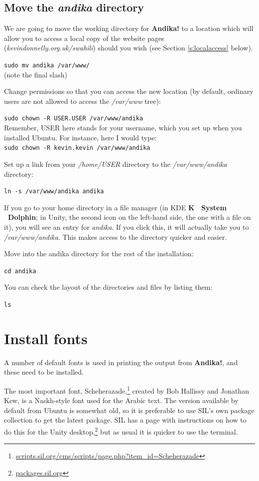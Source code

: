 \subsection{Move the \textit{andika} directory}

We are going to move the working directory for \textbf{Andika!} to a location which will allow you to access a local copy of the website pages (\textit{kevindonnelly.org.uk/swahili}) should you wish (see Section \ref{s:localaccess} below).

\verb|sudo mv andika /var/www/|\\
(note the final slash)

Change permissions so that you can access the new location (by default, ordinary users are not allowed to access the \textit{/var/www} tree):

\verb|sudo chown -R USER.USER /var/www/andika|\\
Remember, USER here stands for your username, which you set up when you installed Ubuntu.  For instance, here I would type:\\
\verb|sudo chown -R kevin.kevin /var/www/andika|

Set up a link from your \textit{/home/USER} directory to the \textit{/var/www/andika} directory:

\verb|ln -s /var/www/andika andika|

If you go to your home directory in a file manager (in KDE \textbf{K \textrightarrow\ System \textrightarrow\ Dolphin}; in Unity, the second icon on the left-hand side, the one with a file on it), you will see an entry for \textit{andika}.  If you click this, it will actually take you to \textit{/var/www/andika}.  This makes access to the directory quicker and easier.

Move into the andika directory for the rest of the installation:

\verb|cd andika|

You can check the layout of the directories and files by listing them:

\verb|ls|


\section{Install fonts}
\label{s:fonts}

A number of default fonts is used in printing the output from \textbf{Andika!}, and these need to be installed.

The most important font, Scheherazade,\footnote{\url{scripts.sil.org/cms/scripts/page.php?item_id=Scheherazade}} created by Bob Hallissy and Jonathan Kew, is a Naskh-style font used for the Arabic text.  The version available by default from Ubuntu is somewhat old, so it is preferable to use SIL's own package collection to get the latest package.  SIL has a page with instructions on how to do this for the Unity desktop,\footnote{\url{packages.sil.org}} but as usual it is quicker to use the terminal.

